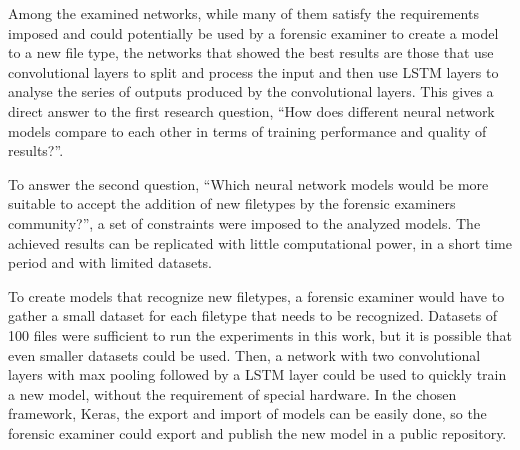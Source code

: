 Among the examined networks, while many of them satisfy the requirements imposed and could potentially be used by a forensic examiner to create a model to a new file type, the networks that showed the best results are those that use convolutional layers to split and process the input and then use LSTM layers to analyse the series of outputs produced by the convolutional layers. This gives a direct answer to the first research question, ``How does different neural network models compare to each other in terms of training performance and quality of results?''.

To answer the second question, ``Which neural network models would be more suitable to accept the addition of new filetypes by the forensic examiners community?'', a set of constraints were imposed to the analyzed models. The achieved results can be replicated with little computational power, in a short time period and with limited datasets.

To create models that recognize new filetypes, a forensic examiner would have to gather a small dataset for each filetype that needs to be recognized. Datasets of 100 files were sufficient to run the experiments in this work, but it is possible that even smaller datasets could be used. Then, a network with two convolutional layers with max pooling followed by a LSTM layer could be used to quickly train a new model, without the requirement of special hardware. In the chosen framework, Keras, the export and import of models can be easily done, so the forensic examiner could export and publish the new model in a public repository.

